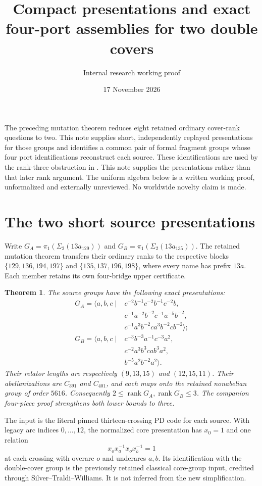 \documentclass[11pt]{article}
\title{Compact presentations and exact four-port assemblies for two double covers}
\author{Internal research working proof}
\date{17 November 2026}
\newtheorem{theorem}{Theorem}
\newcommand{\rank}{\operatorname{rank}}
\begin{document}
\maketitle

The preceding mutation theorem reduces eight retained ordinary cover-rank
questions to two. This note supplies short, independently replayed
presentations for those groups and identifies a common pair of formal
fragment groups whose four port identifications reconstruct each source.
These identifications are used by the rank-three obstruction in
. This note supplies the
presentations rather than that later rank argument. The uniform
algebra below is a written working proof, unformalized and externally
unreviewed. No worldwide novelty claim is made.

\section{The two short source presentations}

Write $G_A=\pi_1(\Sigma_2(13a_{129}))$ and
$G_B=\pi_1(\Sigma_2(13a_{135}))$. The retained mutation theorem transfers
their ordinary ranks to the respective blocks
$\{129,136,194,197\}$ and $\{135,137,196,198\}$, where every name has
prefix $13a$. Each member retains its own four-bridge upper certificate.

\begin{theorem}\label{thm:short}
The source groups have the following exact presentations:
\begin{align*}
G_A=\langle a,b,c\mid{}&
c^{-2}b^{-1}c^{-2}b^{-1}c^{-2}b,\\[-2pt]
&c^{-1}a^{-2}b^{-2}c^{-1}a^{-5}b^{-2},\\[-2pt]
&c^{-1}a^3b^{-2}ca^3b^{-2}cb^{-2}\rangle;\\[4pt]
G_B=\langle a,b,c\mid{}&
c^{-3}b^{-3}a^{-1}c^{-3}a^2,\\[-2pt]
&c^{-2}a^3b^3cab^3a^2,\\[-2pt]
&b^{-5}a^2b^{-2}a^2\rangle.
\end{align*}
Their relator lengths are respectively $(9,13,15)$ and $(12,15,11)$.
Their abelianizations are $C_{391}$ and $C_{401}$, and each maps onto
the retained nonabelian group of order $5616$. Consequently
$2\le\rank G_A,\rank G_B\le3$. The companion four-piece proof
strengthens both lower bounds to three.
\end{theorem}

The input is the literal pinned thirteen-crossing PD code for each
source. With legacy arc indices $0,\ldots,12$, the normalized core
presentation has $x_0=1$ and one relation
\[
 x_o x_a^{-1}x_o x_b^{-1}=1
\]
at each crossing with overarc $o$ and underarcs $a,b$. Its identification
with the double-cover group is the previously retained classical
core-group input, credited through Silver--Traldi--Williams. It is
not inferred from the new simplification.
\end{document}
